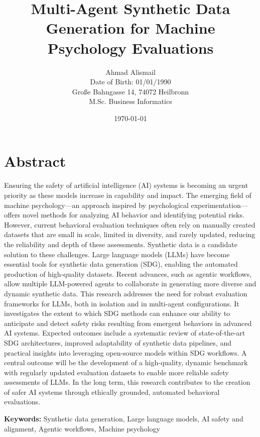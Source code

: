 \documentclass[12pt,a4paper]{article}
\title{Multi-Agent Synthetic Data Generation for Machine Psychology Evaluations}
\author{Ahmad Alismail \\ Date of Birth: 01/01/1990 \\ Große Bahngasse 14, 74072 Heilbronn \\ M.Sc. Business Informatics}
\date{\today}
\begin{document}
\maketitle
\thispagestyle{empty}
\newpage

\section*{Abstract}
\begin{onehalfspacing}
\noindent
Ensuring the safety of artificial intelligence (AI) systems is becoming an urgent priority as these models increase in capability and impact. The emerging field of machine psychology—an approach inspired by psychological experimentation—offers novel methods for analyzing AI behavior and identifying potential risks. However, current behavioral evaluation techniques often rely on manually created datasets that are small in scale, limited in diversity, and rarely updated, reducing the reliability and depth of these assessments. Synthetic data is a candidate solution to these challenges. Large language models (LLMs) have become essential tools for synthetic data generation (SDG), enabling the automated production of high-quality datasets. Recent advances, such as agentic workflows, allow multiple LLM-powered agents to collaborate in generating more diverse and dynamic synthetic data. This research addresses the need for robust evaluation frameworks for LLMs, both in isolation and in multi-agent configurations. It investigates the extent to which SDG methods can enhance our ability to anticipate and detect safety risks resulting from emergent behaviors in advanced AI systems. Expected outcomes include a systematic review of state-of-the-art SDG architectures, improved adaptability of synthetic data pipelines, and practical insights into leveraging open-source models within SDG workflows. A central outcome will be the development of a high-quality, dynamic benchmark with regularly updated evaluation datasets to enable more reliable safety assessments of LLMs. In the long term, this research contributes to the creation of safer AI systems through ethically grounded, automated behavioral evaluations.

\end{onehalfspacing}

\noindent \textbf{Keywords:} Synthetic data generation, Large language models, AI safety and alignment, Agentic workflows, Machine psychology

\newpage
\end{document}
